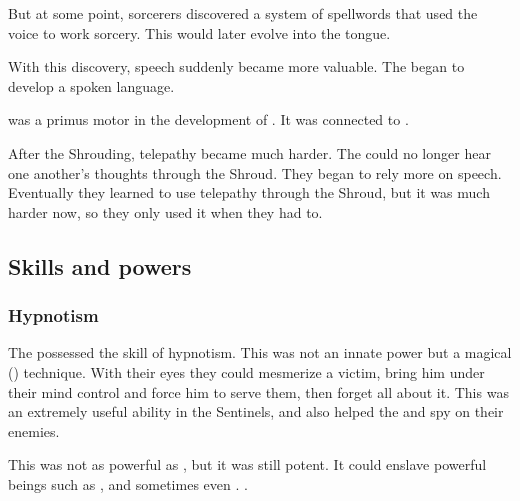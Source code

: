 But at some point, \ophidian{} sorcerers discovered a system of spellwords that used the voice to work sorcery. 
This would later evolve into the  tongue. 

With this discovery, speech suddenly became more valuable. 
The \ophidians{} began to develop a spoken language. 

 was a primus motor in the development of \TrueDraconic. 
It was connected to . 

After the Shrouding, telepathy became much harder. 
The \ophidians could no longer hear one another's thoughts through the Shroud. 
They began to rely more on speech. 
Eventually they learned to use telepathy through the Shroud, but it was much harder now, so they only used it when they had to. 









\subsection{Skills and powers}





\subsubsection{Hypnotism}
The \ophidians possessed the skill of hypnotism.
This was not an innate power but a magical () technique. 
With their eyes they could mesmerize a victim, bring him under their mind control and force him to serve them, then forget all about it. 
This was an extremely useful ability in the Sentinels, and also helped the \ophidians {} and spy on their enemies. 

This was not as powerful as , but it was still potent. 
It could enslave powerful beings such as \aryothim, and sometimes even \resphain.
\Ophidians {}. 






